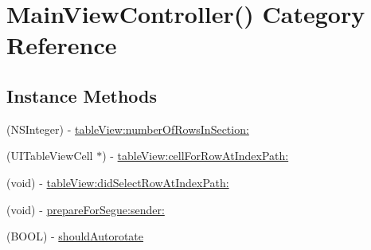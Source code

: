 \hypertarget{category_main_view_controller_07_08}{\section{Main\-View\-Controller() Category Reference}
\label{category_main_view_controller_07_08}
}
\subsection*{Instance Methods}
\begin{DoxyCompactItemize}
\item 
(N\-S\-Integer) -\/ \hyperlink{category_main_view_controller_07_08_a49eba72087aa1824b3b3640a98fc284c}{table\-View\-:number\-Of\-Rows\-In\-Section\-:}
\item 
(U\-I\-Table\-View\-Cell $\ast$) -\/ \hyperlink{category_main_view_controller_07_08_ab8bedbaa87874cbe7fa0ced9a5f14eb3}{table\-View\-:cell\-For\-Row\-At\-Index\-Path\-:}
\item 
(void) -\/ \hyperlink{category_main_view_controller_07_08_a3610fac883355c189d145e8b6057fe56}{table\-View\-:did\-Select\-Row\-At\-Index\-Path\-:}
\item 
(void) -\/ \hyperlink{category_main_view_controller_07_08_a6c4f3fa43407a99c04d218f93ea2b19c}{prepare\-For\-Segue\-:sender\-:}
\item 
(B\-O\-O\-L) -\/ \hyperlink{category_main_view_controller_07_08_a784830177ba35ce27702c95bcafaa9c9}{should\-Autorotate}
\end{DoxyCompactItemize}



